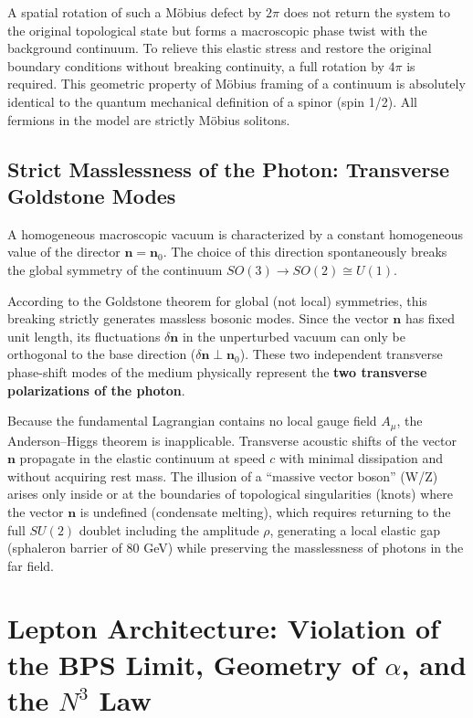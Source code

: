\documentclass[11pt,a4paper]{article}
\begin{document}
A spatial rotation of such a Möbius defect by $2\pi$ does not return the system to the original topological state but forms a macroscopic phase twist with the background continuum. To relieve this elastic stress and restore the original boundary conditions without breaking continuity, a full rotation by $4\pi$ is required. This geometric property of Möbius framing of a continuum is absolutely identical to the quantum mechanical definition of a spinor (spin 1/2). All fermions in the model are strictly Möbius solitons.

\subsection{Strict Masslessness of the Photon: Transverse Goldstone Modes}
A homogeneous macroscopic vacuum is characterized by a constant homogeneous value of the director $\mathbf{n} = \mathbf{n}_0$. The choice of this direction spontaneously breaks the global symmetry of the continuum $SO(3) \to SO(2) \cong U(1)$.

According to the Goldstone theorem for global (not local) symmetries, this breaking strictly generates massless bosonic modes. Since the vector $\mathbf{n}$ has fixed unit length, its fluctuations $\delta \mathbf{n}$ in the unperturbed vacuum can only be orthogonal to the base direction ($\delta \mathbf{n} \perp \mathbf{n}_0$).
These two independent transverse phase-shift modes of the medium physically represent the \textbf{two transverse polarizations of the photon}.

Because the fundamental Lagrangian contains no local gauge field $A_\mu$, the Anderson–Higgs theorem is inapplicable. Transverse acoustic shifts of the vector $\mathbf{n}$ propagate in the elastic continuum at speed $c$ with minimal dissipation and without acquiring rest mass.
The illusion of a ``massive vector boson'' (W/Z) arises only inside or at the boundaries of topological singularities (knots) where the vector $\mathbf{n}$ is undefined (condensate melting), which requires returning to the full $SU(2)$ doublet including the amplitude $\rho$, generating a local elastic gap (sphaleron barrier of 80 GeV) while preserving the masslessness of photons in the far field.

\section{Lepton Architecture: Violation of the BPS Limit, Geometry of $\alpha$, and the $N^3$ Law}
\end{document}
